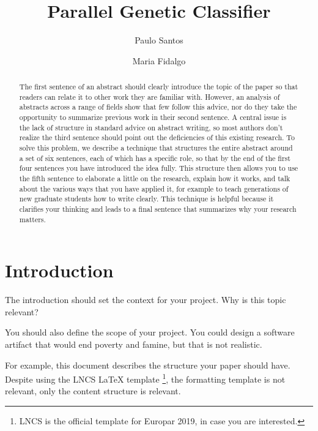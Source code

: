 \documentclass[runningheads]{llncs}
\begin{document}
\title{Parallel Genetic Classifier}

\author{Paulo Santos \and
Maria Fidalgo
}


\maketitle

\begin{abstract}
The first sentence of an abstract should clearly introduce the topic of the paper so that readers can relate it to other work they are familiar with. However, an analysis of abstracts across a range of fields show that few follow this advice, nor do they take the opportunity to summarize previous work in their second sentence. A central issue is the lack of structure in standard advice on abstract writing, so most authors don’t realize the third sentence should point out the deficiencies of this existing research. To solve this problem, we describe a technique that structures the entire abstract around a set of six sentences, each of which has a specific role, so that by the end of the first four sentences you have introduced the idea fully. This structure then allows you to use the fifth sentence to elaborate a little on the research, explain how it works, and talk about the various ways that you have applied it, for example to teach generations of new graduate students how to write clearly. This technique is helpful because it clarifies your thinking and leads to a final sentence that summarizes why your research matters.

\end{abstract}
%
%
%
\section{Introduction}


The introduction should set the context for your project. Why is this topic relevant?

You should also define the scope of your project. You could design a software artifact that would end poverty and famine, but that is not realistic.

For example, this document describes the structure your paper should have. Despite using the LNCS LaTeX template \footnote{LNCS is the official template for Europar 2019, in case you are interested.}, the formatting template is not relevant, only the content structure is relevant.
\end{document}
